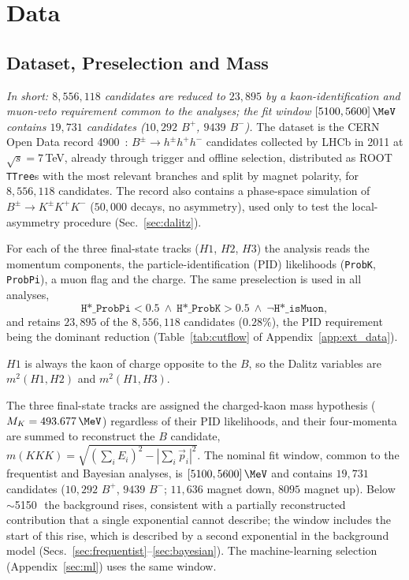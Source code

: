 \section{Data}
\label{sec:data}

\subsection{Dataset, Preselection and Mass}
\label{sec:data_presel}
\emph{In short: $8{,}556{,}118$ candidates are reduced to $23{,}895$ by a kaon-identification and muon-veto requirement common to the analyses; the fit window $[5100,5600]\,\MeV$ contains $19{,}731$ candidates ($10{,}292$ $B^+$, $9439$ $B^-$).}
The dataset is the CERN Open Data record 4900~\cite{opendata_record}: $B^{\pm}\to h^{\pm}h^{+}h^{-}$ candidates collected by LHCb in 2011 at $\sqrt{s}=7$\,TeV, already through trigger and offline selection, distributed as ROOT \texttt{TTree}s with the most relevant branches and split by magnet polarity, for $8{,}556{,}118$ candidates. The record also contains a phase-space simulation of $B^{\pm}\to K^{\pm}K^{+}K^{-}$ ($50{,}000$ decays, no asymmetry), used only to test the local-asymmetry procedure (Sec.~\ref{sec:dalitz}).


For each of the three final-state tracks ($H1$, $H2$, $H3$) the analysis reads the momentum components, the particle-identification (PID) likelihoods (\texttt{ProbK}, \texttt{ProbPi}), a muon flag and the charge. The same preselection is used in all analyses,
\[
\texttt{H*\_ProbPi} < 0.5 \ \wedge\ \texttt{H*\_ProbK} > 0.5 \ \wedge\ \lnot\texttt{H*\_isMuon},
\]
and retains $23{,}895$ of the $8{,}556{,}118$ candidates ($0.28\%$), the PID requirement being the dominant reduction (Table~\ref{tab:cutflow} of Appendix~\ref{app:ext_data}).

$H1$ is always the kaon of charge opposite to the $B$, so the Dalitz variables are $m^2(H1,H2)$ and $m^2(H1,H3)$.

\label{sec:data_mass}
The three final-state tracks are assigned the charged-kaon mass hypothesis ($M_K=493.677\,\MeV$) regardless of their PID likelihoods, and their four-momenta are summed to reconstruct the $B$ candidate, $m(KKK)=\sqrt{(\sum_i E_i)^2-|\sum_i \vec{p}_i|^2}$. The nominal fit window, common to the frequentist and Bayesian analyses, is $[5100,5600]\,\MeV$ and contains $19{,}731$ candidates ($10{,}292$ $B^+$, $9439$ $B^-$; $11{,}636$ magnet down, $8095$ magnet up). Below $\sim$5150\,\MeV\ the background rises, consistent with a partially reconstructed contribution that a single exponential cannot describe; the window includes the start of this rise, which is described by a second exponential in the background model (Secs.~\ref{sec:frequentist}--\ref{sec:bayesian}). The machine-learning selection (Appendix~\ref{sec:ml}) uses the same window.


